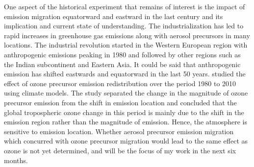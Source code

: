 One aspect of the historical experiment that remains of interest is the impact of emission migration equatorward and eastward in the last century and its implication and current state of understanding. The industrialization has led to rapid increases in greenhouse gas emissions along with aerosol precursors in many locations. The industrial revolution started in the Western European region with anthropogenic emissions peaking in 1980 and followed by other regions such as the Indian subcontinent and Eastern Asia. It could be said that anthropogenic emission has shifted eastwards and equatorward in the last 50 years.  \citet{zhangTroposphericOzoneChange2016} studied the effect of ozone precursor emission redistribution over the period 1980 to 2010 using climate models. The study separated the change in the magnitude of ozone precursor emission from the shift in emission location and concluded that the global tropospheric ozone change in this period is mainly due to the shift in the emission region rather than the magnitude of emission. Hence, the atmosphere is sensitive to emission location. Whether aerosol precursor emission migration which concurred with ozone precursor migration would lead to the same effect as ozone is not yet determined, and will be the focus of my work in the next six months.
